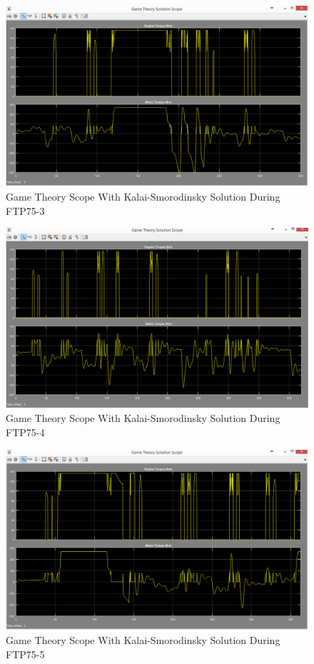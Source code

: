 \begin{figure}[h]
\centering
\includegraphics[scale=0.49]{figures/KalaiSmorodinsky/FTP75-3/gameTheory25Juni}
\caption{Game Theory Scope With Kalai-Smorodinsky Solution During FTP75-3}
\label{fig:gtks3}
\end{figure}

\begin{figure}[h]
\centering
\includegraphics[scale=0.49]{figures/KalaiSmorodinsky/FTP75-4/gameTheory25Juni}
\caption{Game Theory Scope With Kalai-Smorodinsky Solution During FTP75-4}
\label{fig:gtks4}
\end{figure}


\begin{figure}[h]
\centering
\includegraphics[scale=0.49]{figures/KalaiSmorodinsky/FTP75-5/gameTheory26Juni}
\caption{Game Theory Scope With Kalai-Smorodinsky Solution During FTP75-5}
\label{fig:gtks5}
\end{figure}
